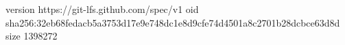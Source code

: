 version https://git-lfs.github.com/spec/v1
oid sha256:32eb68fedacb5a3753d17e9e748dc1e8d9cfe74d4501a8c2701b28dcbce63d8d
size 1398272
